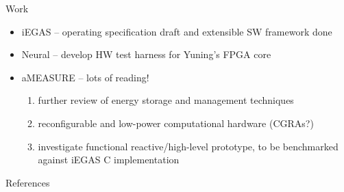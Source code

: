 \documentclass{beamer}
\begin{document}
\begin{frame}{Work}
  \begin{itemize}
    \item{iEGAS -- operating specification draft and extensible SW framework done}
    \item{Neural -- develop HW test harness for Yuning's FPGA core}
    \item{aMEASURE -- lots of reading!
      \begin{enumerate}
        \item{further review of energy storage and management techniques}
        \item{reconfigurable and low-power computational hardware (CGRAs?)}
        \item{investigate functional reactive/high-level prototype, to be 
              benchmarked against iEGAS C implementation}
      \end{enumerate}
    }
  \end{itemize}
\end{frame}

\begin{frame}[allowframebreaks]{References}
  
  
\end{frame}
\end{document}

